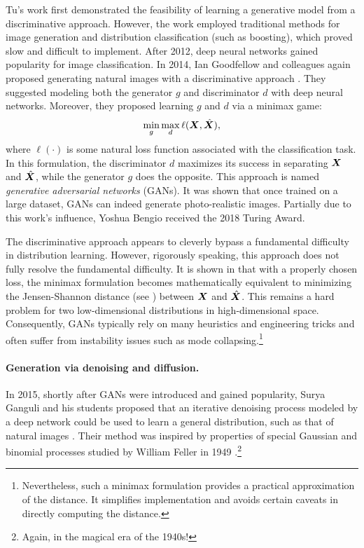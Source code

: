 \documentclass[../../book-main.tex]{subfiles}
\begin{document}
Tu's work \cite{Tu-2007} first demonstrated the feasibility of learning a generative model from a discriminative approach. However, the work employed traditional methods for image generation and distribution classification (such as boosting), which proved slow and difficult to implement. After 2012, deep neural networks gained popularity for image classification. In 2014, Ian Goodfellow and colleagues again proposed generating natural images with a discriminative approach \cite{Goodfellow-2014}. They suggested modeling both the generator $g$ and discriminator $d$ with deep neural networks. Moreover, they proposed learning $g$ and $d$ via a minimax game:
\begin{equation}
    \min_g \max_d \ell(\bm{X}, \hat {\bm{X}}),
\end{equation}
where $\ell(\cdot)$ is some natural loss function associated with the classification task. In this formulation, the discriminator $d$ maximizes its success in separating $\bm{X}$ and $\hat {\bm{X}}$, while the generator $g$ does the opposite. This approach is named \textit{generative adversarial networks} (GANs). It was shown that once trained on a large dataset, GANs can indeed generate photo-realistic images. Partially due to this work's influence, Yoshua Bengio received the 2018 Turing Award.

The discriminative approach appears to cleverly bypass a fundamental difficulty in distribution learning. However, rigorously speaking, this approach does not fully resolve the fundamental difficulty. It is shown in \cite{Goodfellow-2014} that with a properly chosen loss, the minimax formulation becomes mathematically equivalent to minimizing the Jensen-Shannon distance (see \cite{Cover-Thomas}) between $\bm{X}$ and $\hat {\bm{X}}$. This remains a hard problem for two low-dimensional distributions in high-dimensional space. Consequently, GANs typically rely on many heuristics and engineering tricks and often suffer from instability issues such as mode collapsing.\footnote{Nevertheless, such a minimax formulation provides a practical approximation of the distance. It simplifies implementation and avoids certain caveats in directly computing the distance.}

\paragraph{Generation via denoising and diffusion.}
In 2015, shortly after GANs were introduced and gained popularity, Surya Ganguli and his students proposed that an iterative denoising process modeled by a deep network could be used to learn a general distribution, such as that of natural images \cite{Sohl-Dickstein2015}. Their method was inspired by properties of special Gaussian and binomial processes studied by William Feller in 1949 \cite{Feller1949OnTT}.\footnote{Again, in the magical era of the 1940s!}
\end{document}
